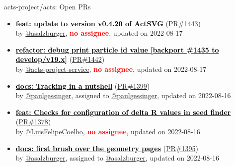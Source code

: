 \begin{frame}[allowframebreaks]{ acts-project/acts: Open PRs
}

  \begin{itemize}
    
    
    \item\propen
    \hspace*{0.1em}
    \textbf{\href{https://github.com/acts-project/acts/pull/1443}{\textcolor{black}{feat: update to version v0.4.20 of ActSVG}}}
    (\href{https://github.com/acts-project/acts/pull/1443}{PR\#1443}) \\
    by \href{https://github.com/asalzburger}{@asalzburger}, {}\textbf{\textcolor{Red}{no assignee}}, updated on 2022-08-17

    \item\propen
    \hspace*{0.1em}
    \textbf{\href{https://github.com/acts-project/acts/pull/1442}{\textcolor{black}{refactor: debug print particle id value [backport \#1435 to develop/v19.x]}}}
    (\href{https://github.com/acts-project/acts/pull/1442}{PR\#1442}) \\
    by \href{https://github.com/acts-project-service}{@acts-project-service}, {}\textbf{\textcolor{Red}{no assignee}}, updated on 2022-08-17

    \item\propen
    \hspace*{0.1em}
    \textbf{\href{https://github.com/acts-project/acts/pull/1399}{\textcolor{black}{docs: Tracking in a nutshell}}}
    (\href{https://github.com/acts-project/acts/pull/1399}{PR\#1399}) \\
    by \href{https://github.com/paulgessinger}{@paulgessinger}, {}assigned to \href{https://github.com/paulgessinger}{@paulgessinger}, updated on 2022-08-16

    \item\propen
    \hspace*{0.1em}
    \textbf{\href{https://github.com/acts-project/acts/pull/1378}{\textcolor{black}{feat: Checks for configuration of delta R values in seed finder}}}
    (\href{https://github.com/acts-project/acts/pull/1378}{PR\#1378}) \\
    by \href{https://github.com/LuisFelipeCoelho}{@LuisFelipeCoelho}, {}\textbf{\textcolor{Red}{no assignee}}, updated on 2022-08-16

    \item\propen
    \hspace*{0.1em}
    \textbf{\href{https://github.com/acts-project/acts/pull/1395}{\textcolor{black}{docs: first brush over the geometry pages}}}
    (\href{https://github.com/acts-project/acts/pull/1395}{PR\#1395}) \\
    by \href{https://github.com/asalzburger}{@asalzburger}, {}assigned to \href{https://github.com/asalzburger}{@asalzburger}, updated on 2022-08-16


\end{itemize}
\end{frame}
